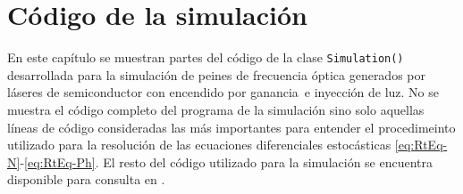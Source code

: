 \documentclass[a4paper, 11pt, oneside]{book}
\newcommand{\gs}{encendido por ganancia}
\begin{document}
				\chapter{Código de la simulación}
					\label{App:Code}

					En este cap\'itulo se muestran partes del c\'odigo de la clase \texttt{Simulation()} desarrollada para la simulaci\'on de peines de frecuencia \'optica generados por l\'aseres de semiconductor con \gs\ e inyecci\'on de luz. No se muestra el c\'odigo completo del programa de la simulaci\'on sino solo aquellas l\'ineas de c\'odigo consideradas las m\'as importantes para entender el procedimeinto utilizado para la resoluci\'on de las ecuaciones diferenciales estoc\'asticas \ref{eq:RtEq-N}-\ref{eq:RtEq-Ph}. El resto del c\'odigo utilizado para la simulaci\'on se encuentra disponible para consulta en \cite{github}.
					
					
	
\end{document}
